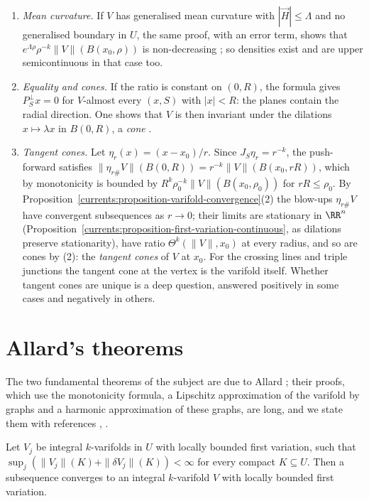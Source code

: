 \begin{remark}\label{currents:remark-monotonicity}
\begin{enumerate}
\item \emph{Mean curvature.} If $V$ has generalised mean curvature with $|\vec{H}| \leq \Lambda$ and no generalised boundary in $U$, the same proof, with an error term, shows that
$e^{\Lambda\rho}\rho^{-k}\|V\|(B(x_0, \rho))$ is non-decreasing \cite{simon-gmt}; so densities exist and are upper semicontinuous in that case too.
\item \emph{Equality and cones.} If the ratio is constant on $(0, R)$, the formula gives $P_S^\perp x = 0$ for $V$-almost every $(x, S)$ with $|x| < R$: the planes contain the radial direction. One shows that
$V$ is then invariant under the dilations $x \mapsto \lambda x$ in $B(0, R)$, a \emph{cone} \cite{simon-gmt}.
\item \emph{Tangent cones.} Let $\eta_r(x) = (x - x_0)/r$. Since $J_S\eta_r = r^{-k}$, the push-forward satisfies $\|\eta_{r\#}V\|(B(0, R)) = r^{-k}\|V\|(B(x_0, rR))$, which by monotonicity is bounded by
$R^k\rho_0^{-k}\|V\|(B(x_0, \rho_0))$ for $rR \leq \rho_0$. By Proposition~\ref{currents:proposition-varifold-convergence}(2) the blow-ups $\eta_{r\#}V$ have convergent subsequences as $r \to 0$; their limits
are stationary in $\RR^n$ (Proposition~\ref{currents:proposition-first-variation-continuous}, as dilations preserve stationarity), have ratio $\Theta^k(\|V\|, x_0)$ at every radius, and so are cones by (2): the
\emph{tangent cones} of $V$ at $x_0$. For the crossing lines and triple junctions the tangent cone at the vertex is the varifold itself. Whether tangent cones are unique is a deep question, answered
positively in some cases and negatively in others.
\end{enumerate}
\end{remark}

\section{Allard's theorems}\label{currents:section-allard}

The two fundamental theorems of the subject are due to Allard \cite{allard-1972}; their proofs, which use the monotonicity formula, a Lipschitz approximation of the varifold by graphs and a harmonic
approximation of these graphs, are long, and we state them with references \cite{allard-1972}, \cite{simon-gmt}.

\begin{theorem}\label{currents:theorem-allard-compactness}
Let $V_j$ be integral $k$-varifolds in $U$ with locally bounded first variation, such that $\sup_j(\|V_j\|(K) + \|\delta V_j\|(K)) < \infty$ for every compact $K \subseteq U$. Then a subsequence converges to an
integral $k$-varifold $V$ with locally bounded first variation.
\end{theorem}

